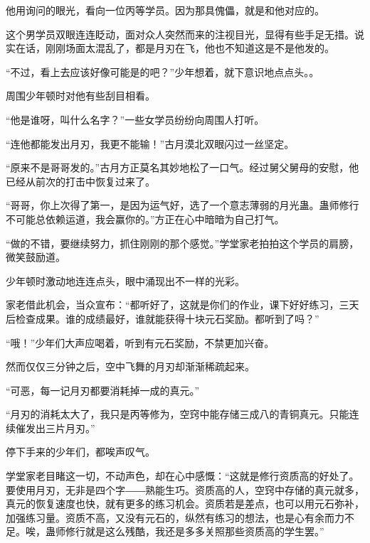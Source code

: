 \begin{this_body}
他用询问的眼光，看向一位丙等学员。因为那具傀儡，就是和他对应的。

这个男学员双眼连连眨动，面对众人突然而来的注视目光，显得有些手足无措。说实在话，刚刚场面太混乱了，都是月刃在飞，他也不知道这是不是他发的。

“不过，看上去应该好像可能是的吧？”少年想着，就下意识地点点头。。

周围少年顿时对他有些刮目相看。

“他是谁呀，叫什么名字？”一些女学员纷纷向周围人打听。

“连他都能发出月刃，我更不能输！”古月漠北双眼闪过一丝坚定。

“原来不是哥哥发的。”古月方正莫名其妙地松了一口气。经过舅父舅母的安慰，他已经从前次的打击中恢复过来了。

“哥哥，你上次得了第一，是因为运气好，选了一个意志薄弱的月光蛊。蛊师修行不可能总依赖运道，我会赢你的。”方正在心中暗暗为自己打气。

“做的不错，要继续努力，抓住刚刚的那个感觉。”学堂家老拍拍这个学员的肩膀，微笑鼓励道。

少年顿时激动地连连点头，眼中涌现出不一样的光彩。

家老借此机会，当众宣布：“都听好了，这就是你们的作业，课下好好练习，三天后检查成果。谁的成绩最好，谁就能获得十块元石奖励。都听到了吗？”

“哦！”少年们大声应喝着，听到有元石奖励，不禁更加兴奋。

然而仅仅三分钟之后，空中飞舞的月刃却渐渐稀疏起来。

“可恶，每一记月刃都要消耗掉一成的真元。”

“月刃的消耗太大了，我只是丙等修为，空窍中能存储三成八的青铜真元。只能连续催发出三片月刃。”

停下手来的少年们，都唉声叹气。

学堂家老目睹这一切，不动声色，却在心中感慨：“这就是修行资质高的好处了。要使用月刃，无非是四个字――熟能生巧。资质高的人，空窍中存储的真元就多，真元的恢复速度也快，就有更多的练习机会。资质若是差点，也可以用元石弥补，加强练习量。资质不高，又没有元石的，纵然有练习的想法，也是心有余而力不足。唉，蛊师修行就是这么残酷，我还是多多关照那些资质高的学生罢。”

\end{this_body}


